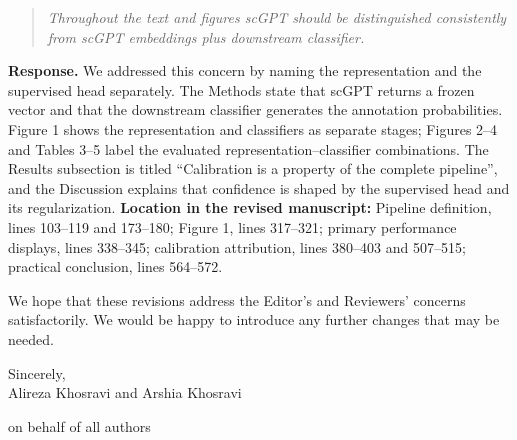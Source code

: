 \documentclass[10pt,a4paper]{article}
\newcommand{\commenttext}[1]{\begin{quote}\colorbox{gray!15}{\parbox{0.91\linewidth}{\itshape #1}}\end{quote}}
\begin{document}
\commenttext{Throughout the text and figures scGPT should be distinguished consistently from scGPT embeddings plus downstream classifier.}

\textcolor{responseblue}{\textbf{Response.}} We addressed this concern by naming the representation and the supervised head separately. The Methods state that scGPT returns a frozen vector and that the downstream classifier generates the annotation probabilities. Figure 1 shows the representation and classifiers as separate stages; Figures 2--4 and Tables 3--5 label the evaluated representation--classifier combinations. The Results subsection is titled ``Calibration is a property of the complete pipeline'', and the Discussion explains that confidence is shaped by the supervised head and its regularization. \textbf{Location in the revised manuscript:} Pipeline definition, lines 103--119 and 173--180; Figure 1, lines 317--321; primary performance displays, lines 338--345; calibration attribution, lines 380--403 and 507--515; practical conclusion, lines 564--572.


We hope that these revisions address the Editor's and Reviewers' concerns satisfactorily. We would be happy to introduce any further changes that may be needed.


\vspace{0.5em}

Sincerely,\\

Alireza Khosravi and Arshia Khosravi


on behalf of all authors
\end{document}
